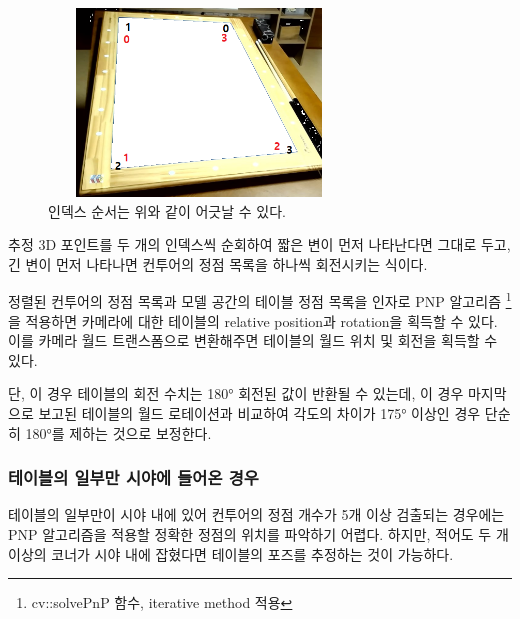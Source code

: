\documentclass[10pt]{oblivoir}
\begin{document}
\begin{figure}[ht]
    \begin{center}
        \includegraphics[width=8cm, height=5cm, keepaspectratio]{img/billiards-table-indexes.png}
    \end{center}
    \caption{인덱스 순서는 위와 같이 어긋날 수 있다.}
    \label{fig;pool-table-invalid-index}
\end{figure}

추정 3D 포인트를 두 개의 인덱스씩 순회하여 짧은 변이 먼저 나타난다면 그대로 두고, 긴 변이 먼저 나타나면 컨투어의 정점 목록을 하나씩 회전시키는 식이다.

정렬된 컨투어의 정점 목록과 모델 공간의 테이블 정점 목록을 인자로 PNP 알고리즘
\footnote{cv::solvePnP 함수, iterative method 적용}
을 적용하면 카메라에 대한 테이블의 relative position과 rotation을 획득할 수 있다. 이를 카메라 월드 트랜스폼으로 변환해주면 테이블의 월드 위치 및 회전을 획득할 수 있다.

단, 이 경우 테이블의 회전 수치는 180\si{\degree} 회전된 값이 반환될 수 있는데, 이 경우 마지막으로 보고된 테이블의 월드 로테이션과 비교하여 각도의 차이가 175\si{\degree} 이상인 경우 단순히 180\si{\degree}를 제하는 것으로 보정한다.

\subsubsection{테이블의 일부만 시야에 들어온 경우}

테이블의 일부만이 시야 내에 있어 컨투어의 정점 개수가 5개 이상 검출되는 경우에는 PNP 알고리즘을 적용할 정확한 정점의 위치를 파악하기 어렵다. 하지만, 적어도 두 개 이상의 코너가 시야 내에 잡혔다면 테이블의 포즈를 추정하는 것이 가능하다.
\end{document}
